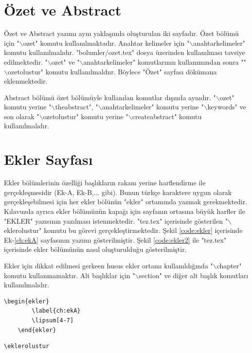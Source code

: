 \chapter{Özet ve Abstract}
\label{ch:ozet}
Özet ve Abstract yazımı aynı yaklaşımla oluşturulan iki sayfadır. Özet bölümü için "$\backslash$ozet" komutu kullanılmaktadır. Anahtar kelimeler için "$\backslash$anahtarkelimeler" komutu kullanılmalıdır. "bolumler/ozet.tex" dosya üzerinden kullanılması tavsiye edilmektedir. "$\backslash$ozet" ve "$\backslash$anahtarkelimeler" komutlarının kullanımından sonra ""$\backslash$ozetolustur" komutu kullanılmaldıır. Böylece "Özet" sayfası dökümana eklenmektedir. 

Abstract bölümü özet bölümüyle kullanılan komutlar dışında aynıdır. "$\backslash$ozet" komutu yerine "$\backslash$theabstract", "$\backslash$anahtarkelimeler" komutu yerine "$\backslash$keywords" ve son olarak "$\backslash$ozetolustur" komutu yerine "$\backslash$createabstract" komutu kullanılmalıdır. 


\chapter{Ekler Sayfası}
\label{ch:ek}
Ekler bölümlerinin özelliği başlıkların rakam yerine harflendirme ile gerçekleşmesidir (Ek-A, Ek-B,... gibi). Bunun türkçe karaktere uygun olarak gerçekleşebilmesi için her ekler bölünün "ekler" ortamında yazmak gerekmektedir. Kılavuzda ayrıca ekler bölümünün kapağı için sayfanın ortasına büyük harfler ile "EKLER" yazısının yazılması istenmektedir. "tez.tex" içerisinde gösterilen "$\backslash$eklerolustur" komutu bu görevi gerçekleştirmektedir. Şekil \ref{code:ekler} içerisinde Ek-\ref{ch:ekA} sayfasının yazımı gösterilmiştir. Şekil \ref{code:ekler2} ile "tez.tex" içerisinde ekler bölümünün nasıl oluşturulduğu gösterilmiştir.

Ekler için dikkat edilmesi gerkeen husus ekler ortamı kullanıldığında "$\backslash$chapter" komutu kullanmamaktır. Alt başlıklar için "$\backslash$section" ve diğer alt başlık komutları kullanılmalıdır.


\begin{lstlisting}[language={[LaTeX]{TeX}}, label=code:ekler, caption=Örnek ekler sayfası]
	\begin{ekler}
		\label{ch:ekA}
		\lipsum[4-7]
	\end{ekler}
\end{lstlisting}

\begin{lstlisting}[language={[LaTeX]{TeX}}, label=code:ekler2, caption=tez.tex içerisinde ekler bölümünün oluşturulması]
	\eklerolustur
	
\end{lstlisting}


